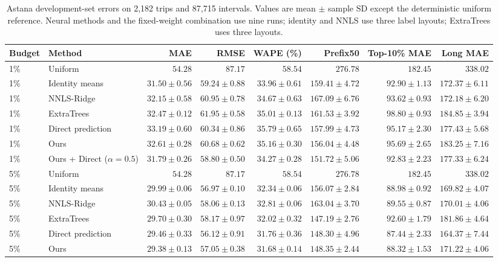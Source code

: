 \begin{table}[t]
\centering\scriptsize\setlength{\tabcolsep}{2.5pt}
\caption{Astana development-set errors on 2,182 trips and 87,715 intervals. Values are mean $\pm$ sample SD except the deterministic uniform reference. Neural methods and the fixed-weight combination use nine runs; identity and NNLS use three label layouts; ExtraTrees uses three layouts.}\label{tab:limited}
\begin{tabular}{llrrrrrr}\toprule
Budget & Method & MAE & RMSE & WAPE (\%) & Prefix50 & Top-10\% MAE & Long MAE\\\midrule
1\% & Uniform & $54.28$ & $87.17$ & $58.54$ & $276.78$ & $182.45$ & $338.02$\\
1\% & Identity means & $\mathbf{31.50\pm0.56}$ & $59.24\pm0.88$ & $\mathbf{33.96\pm0.61}$ & $159.41\pm4.72$ & $92.90\pm1.13$ & $172.37\pm6.11$\\
1\% & NNLS-Ridge & $32.15\pm0.58$ & $60.95\pm0.78$ & $34.67\pm0.63$ & $167.09\pm6.76$ & $93.62\pm0.93$ & $\mathbf{172.18\pm6.20}$\\
1\% & ExtraTrees & $32.47\pm0.12$ & $61.95\pm0.58$ & $35.01\pm0.13$ & $161.53\pm3.92$ & $98.80\pm0.93$ & $184.85\pm3.94$\\
1\% & Direct prediction & $33.19\pm0.60$ & $60.34\pm0.86$ & $35.79\pm0.65$ & $157.99\pm4.73$ & $95.17\pm2.30$ & $177.43\pm5.68$\\
1\% & Ours & $32.61\pm0.28$ & $60.68\pm0.62$ & $35.16\pm0.30$ & $156.04\pm4.48$ & $95.69\pm2.65$ & $183.25\pm7.16$\\
1\% & Ours + Direct ($\alpha=0.5$) & $31.79\pm0.26$ & $\mathbf{58.80\pm0.50}$ & $34.27\pm0.28$ & $\mathbf{151.72\pm5.06}$ & $\mathbf{92.83\pm2.23}$ & $177.33\pm6.24$\\
\midrule
5\% & Uniform & $54.28$ & $87.17$ & $58.54$ & $276.78$ & $182.45$ & $338.02$\\
5\% & Identity means & $29.99\pm0.06$ & $56.97\pm0.10$ & $32.34\pm0.06$ & $156.07\pm2.84$ & $88.98\pm0.92$ & $169.82\pm4.07$\\
5\% & NNLS-Ridge & $30.43\pm0.05$ & $58.06\pm0.13$ & $32.81\pm0.06$ & $163.04\pm3.70$ & $89.55\pm0.87$ & $170.01\pm4.06$\\
5\% & ExtraTrees & $29.70\pm0.30$ & $58.17\pm0.97$ & $32.02\pm0.32$ & $147.19\pm2.76$ & $92.60\pm1.79$ & $181.86\pm4.64$\\
5\% & Direct prediction & $29.46\pm0.33$ & $56.12\pm0.91$ & $31.76\pm0.36$ & $148.30\pm4.96$ & $87.44\pm2.33$ & $\mathbf{164.37\pm7.44}$\\
5\% & Ours & $29.38\pm0.13$ & $57.05\pm0.38$ & $31.68\pm0.14$ & $148.35\pm2.44$ & $88.32\pm1.53$ & $171.22\pm4.06$\\

\end{tabular}
\end{table}
